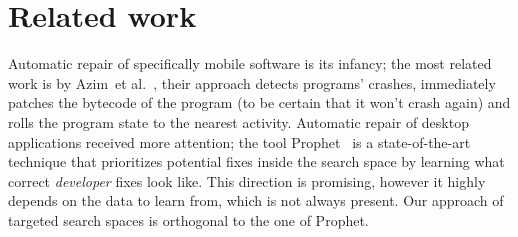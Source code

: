 \section{Related work}

Automatic repair of specifically mobile software is its infancy; the most related work is by Azim~et al.~\cite{azim2014towards}, their approach detects programs' crashes, immediately patches the bytecode of the program (to be certain that it won't crash again) and rolls the program state to the nearest activity. Automatic repair of desktop applications received more attention; the tool Prophet~\cite{long2015prophet} is a state-of-the-art technique that prioritizes potential fixes inside the search space by learning what correct \emph{developer} fixes look like. This direction is promising, however it highly depends on the data to learn from, which is not always present. Our approach of targeted search spaces is orthogonal to the one of Prophet.
